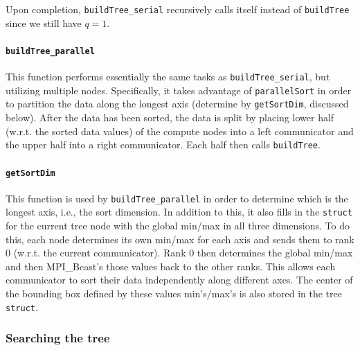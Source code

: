 \documentclass{article}
\begin{document}
%
%

Upon completion, \texttt{buildTree\_serial} recursively calls itself instead of \texttt{buildTree} since we still have $q=1$.


\paragraph{\texttt{buildTree\_parallel}}
This function performs essentially the same tasks as \texttt{buildTree\_serial}, but utilizing multiple nodes. Specifically, it takes advantage of \texttt{parallelSort} in order to partition the data along the longest axis (determine by \texttt{getSortDim}, discussed below). After the data has been sorted, the data is split by placing lower half (w.r.t. the sorted data values) of the compute nodes into a left communicator and the upper half into a right communicator. Each half then calls \texttt{buildTree}.



\paragraph{\texttt{getSortDim}}
This function is used by \texttt{buildTree\_parallel} in order to determine which is the longest axis, i.e., the sort dimension. In addition to this, it also fills in the \texttt{struct} for the current tree node with the global min/max in all three dimensions. To do this, each node determines its own min/max for each axis and sends them to rank 0 (w.r.t. the current communicator). Rank 0 then determines the global min/max and then MPI\_Bcast's those values back to the other ranks. This allows each communicator to sort their data independently along different axes. The center of the bounding box defined by these values min's/max's is also stored in the tree \texttt{struct}. 


\subsubsection{Searching the tree}
\end{document}
